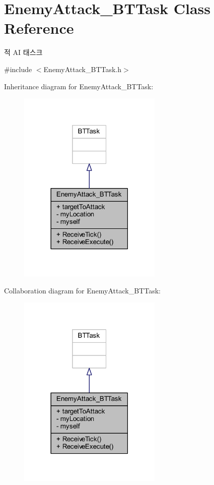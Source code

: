 \hypertarget{class_enemy_attack___b_t_task}{}\section{Enemy\+Attack\+\_\+\+B\+T\+Task Class Reference}
\label{class_enemy_attack___b_t_task}


적 AI 태스크  




{\ttfamily \#include $<$Enemy\+Attack\+\_\+\+B\+T\+Task.\+h$>$}



Inheritance diagram for Enemy\+Attack\+\_\+\+B\+T\+Task\+:\nopagebreak
\begin{figure}[H]
\begin{center}
\leavevmode
\includegraphics[width=194pt]{class_enemy_attack___b_t_task__inherit__graph}
\end{center}
\end{figure}


Collaboration diagram for Enemy\+Attack\+\_\+\+B\+T\+Task\+:\nopagebreak
\begin{figure}[H]
\begin{center}
\leavevmode
\includegraphics[width=194pt]{class_enemy_attack___b_t_task__coll__graph}
\end{center}
\end{figure}
